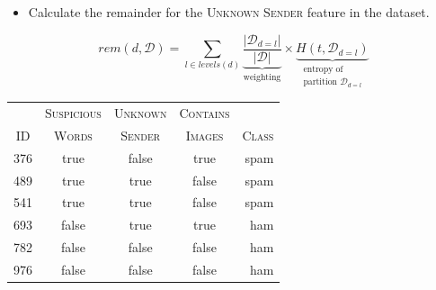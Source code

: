 \documentclass[xcolor={table}]{beamer}
\newcommand{\featN}[1]{\textsc{#1}}
\begin{document}
\begin{frame}
	\begin{itemize}
		\item Calculate the \alert{remainder} for the \featN{Unknown Sender} feature in the dataset.
	\end{itemize}
\begin{equation*}
rem\left(d,\mathcal{D}\right) = 
\sum_{l \in levels\left(d\right)} 
\underbrace{
\frac{|\mathcal{D}_{d=l}|}{|\mathcal{D}|}}_{\text{weighting}} \times
 \underbrace{H\left(t, \mathcal{D}_{d=l}\right)}_{
	\substack{
		\text{entropy of}\\
		\text{partition }\mathcal{D}_{d=l}
	}
}
\end{equation*}
	\begin{table}[!hbt]
\centering
\begin{footnotesize}
\begin{tabular}{ccccr}
\hline
	 & \featN{Suspicious}	& \featN{Unknown}	 & \featN{Contains}	 & \featN{} \\
\featN{ID}	 & \featN{Words}	& \featN{Sender}	 & \featN{Images}	 & \featN{Class} \\
\hline
376	 & true	 & false 	 & true	& spam \\
489	 & true	 & true 	 & false	& spam \\
541	 & true	 & true 	 & false	& spam \\
693	 & false	 & true 	 & true	& ham \\
782	 & false	 & false 	 & false	& ham \\
976	 & false	 & false 	 & false	& ham \\
\hline
\end{tabular}
\end{footnotesize}
\end{table}
\end{frame}
\end{document}
